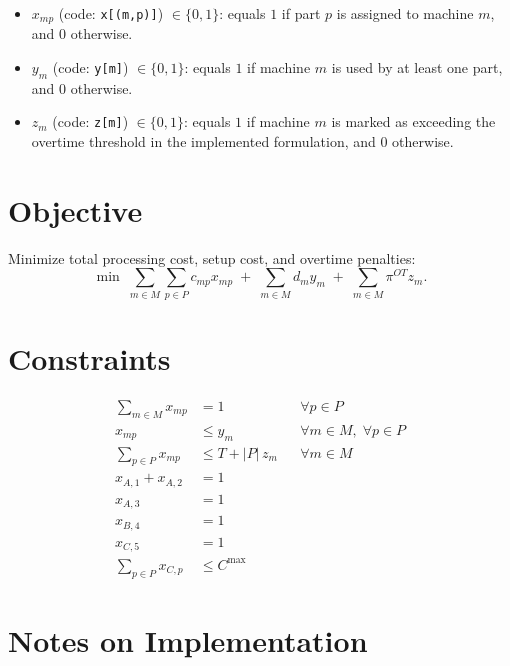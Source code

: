 \begin{itemize}
    \item $x_{mp}$ (code: \texttt{x[(m,p)]}) $\in \{0,1\}$: equals $1$ if part $p$ is assigned to machine $m$, and $0$ otherwise.
    \item $y_m$ (code: \texttt{y[m]}) $\in \{0,1\}$: equals $1$ if machine $m$ is used by at least one part, and $0$ otherwise.
    \item $z_m$ (code: \texttt{z[m]}) $\in \{0,1\}$: equals $1$ if machine $m$ is marked as exceeding the overtime threshold in the implemented formulation, and $0$ otherwise.
\end{itemize}

\section*{Objective}

Minimize total processing cost, setup cost, and overtime penalties:
\[
\min \;
\sum_{m \in M}\sum_{p \in P} c_{mp} x_{mp}
\;+\;
\sum_{m \in M} d_m y_m
\;+\;
\sum_{m \in M} \pi^{OT} z_m.
\]

\section*{Constraints}

\begin{align}
\sum_{m \in M} x_{mp} &= 1 && \forall p \in P
\label{eq:assign}
\\
x_{mp} &\le y_m && \forall m \in M,\; \forall p \in P
\label{eq:use_link}
\\
\sum_{p \in P} x_{mp} &\le T + |P|\, z_m && \forall m \in M
\label{eq:overtime_link}
\\
x_{A,1} + x_{A,2} &= 1
\label{eq:part12}
\\
x_{A,3} &= 1
\label{eq:part3}
\\
x_{B,4} &= 1
\label{eq:part4}
\\
x_{C,5} &= 1
\label{eq:part5}
\\
\sum_{p \in P} x_{C,p} &\le C^{\max}
\label{eq:capC}
\end{align}

\section*{Notes on Implementation}

